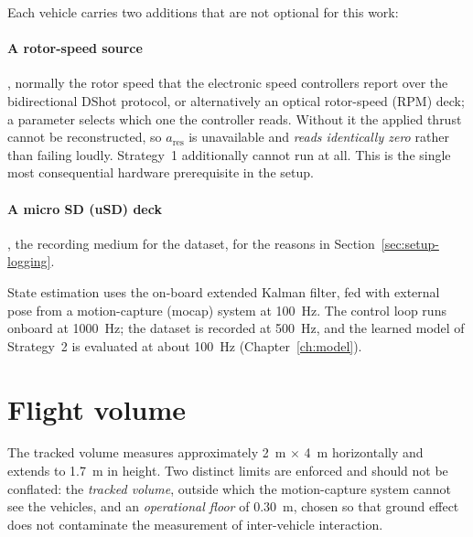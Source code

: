 Each vehicle carries two additions that are not optional for this work:

\paragraph{A rotor-speed source}, normally the rotor speed that the electronic speed controllers
report over the bidirectional DShot protocol, or alternatively an optical rotor-speed (RPM) deck;
a parameter selects which one the controller reads. Without it the applied
thrust cannot be reconstructed, so $a_{\mathrm{res}}$ is unavailable and \emph{reads identically
zero} rather than failing loudly. Strategy~1 additionally cannot run at all. This is the
single most consequential hardware prerequisite in the setup.

\paragraph{A micro SD (uSD) deck}, the recording medium for the dataset, for the reasons in
Section~\ref{sec:setup-logging}.

State estimation uses the on-board extended Kalman filter, fed with external pose from a
motion-capture (mocap) system at \SI{100}{\hertz}. The control loop runs onboard at
\SI{1000}{\hertz}; the dataset is recorded at \SI{500}{\hertz}, and the learned model of
Strategy~2 is evaluated at about \SI{100}{\hertz} (Chapter~\ref{ch:model}).

\section{Flight volume}
\label{sec:setup-volume}

The tracked volume measures approximately \SI{2}{\metre} $\times$ \SI{4}{\metre} horizontally and
extends to \SI{1.7}{\metre} in height. Two distinct limits are enforced and should not be
conflated: the \emph{tracked volume}, outside which the motion-capture system cannot see the
vehicles, and an \emph{operational floor} of \SI{0.30}{\metre}, chosen so that ground effect does
not contaminate the measurement of inter-vehicle interaction.

